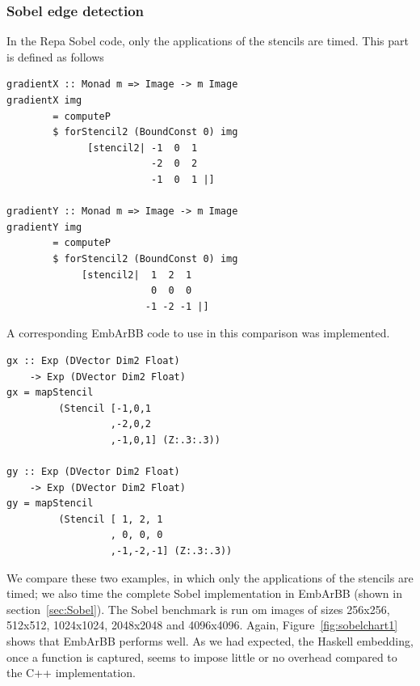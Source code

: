 \subsubsection{Sobel edge detection}
In the Repa Sobel code, only the applications of the stencils are timed. This 
part is defined as follows 
\begin{verbatim}
gradientX :: Monad m => Image -> m Image
gradientX img
        = computeP
        $ forStencil2 (BoundConst 0) img
              [stencil2| -1  0  1
                         -2  0  2
                         -1  0  1 |]

gradientY :: Monad m => Image -> m Image
gradientY img
        = computeP
        $ forStencil2 (BoundConst 0) img
             [stencil2|  1  2  1
                         0  0  0
                        -1 -2 -1 |] 
\end{verbatim}

A corresponding EmbArBB code to use in this comparison was implemented.




\begin{verbatim} 
gx :: Exp (DVector Dim2 Float) 
    -> Exp (DVector Dim2 Float)  
gx = mapStencil 
         (Stencil [-1,0,1
                  ,-2,0,2
                  ,-1,0,1] (Z:.3:.3)) 

gy :: Exp (DVector Dim2 Float) 
    -> Exp (DVector Dim2 Float) 
gy = mapStencil 
         (Stencil [ 1, 2, 1
                  , 0, 0, 0
                  ,-1,-2,-1] (Z:.3:.3))
\end{verbatim}


We compare these two examples, in which only the applications of the stencils
are timed; we also time the complete Sobel implementation in EmbArBB (shown
in section~\ref{sec:Sobel}).
The Sobel benchmark is run om images of sizes 256x256, 512x512, 1024x1024, 2048x2048 and 4096x4096.
Again, Figure~\ref{fig:sobelchart1} shows that EmbArBB performs well.  As we had expected, the 
Haskell embedding, once a function is captured, seems to impose little or no overhead 
compared to the C++ implementation.

